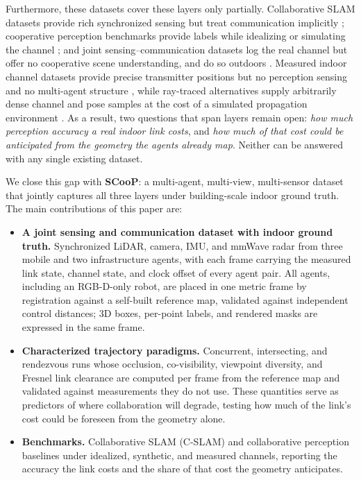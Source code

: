 \documentclass[conference]{IEEEtran}
\begin{document}
Furthermore, these datasets cover these layers only partially. Collaborative SLAM
datasets provide rich synchronized sensing but treat communication
implicitly \cite{s3e,kimeramulti,coped}; cooperative perception
benchmarks provide labels while idealizing or simulating the channel
\cite{opv2v,dairv2x,v2v4real}; and joint sensing--communication datasets
log the real channel but offer no cooperative scene understanding, and do
so outdoors \cite{deepsense6g}. Measured indoor channel datasets
provide precise transmitter positions but no perception sensing and no
multi-agent structure \cite{dichasus}, while ray-traced alternatives
supply arbitrarily dense channel and pose samples at the cost of a
simulated propagation environment \cite{deepmimo}. As a result, two questions that span layers remain open: \emph{how much
perception accuracy a real indoor link costs}, and \emph{how much of that
cost could be anticipated from the geometry the agents already map}.
Neither can be answered with any single existing dataset.

We close this gap with \textbf{SCooP}: a multi-agent, multi-view,
multi-sensor dataset that jointly captures all three layers under
building-scale indoor ground truth. The main contributions of this
paper are:
\begin{itemize}
    \item \textbf{A joint sensing and communication dataset with indoor ground truth.}
    Synchronized LiDAR, camera, IMU, and mmWave radar from three mobile and two
    infrastructure agents, with each frame carrying the measured link state,
    channel state, and clock offset of every agent pair. All agents, including an RGB-D-only robot, are placed in one metric
    frame by registration against a self-built reference map, validated
    against independent control distances; 3D boxes, per-point labels,
    and rendered masks are expressed in the same frame.
   \item \textbf{Characterized trajectory paradigms.}
    Concurrent, intersecting, and rendezvous runs whose occlusion, co-visibility, viewpoint diversity, and Fresnel link clearance are computed per frame from the reference map and validated against measurements they do not use. These quantities serve as predictors of where collaboration will degrade, testing how much of the link's cost could be foreseen from the geometry alone.
   \item \textbf{Benchmarks.} Collaborative SLAM (C-SLAM) and collaborative perception baselines under idealized, synthetic, and measured channels, reporting the accuracy the link costs and the share of that cost the geometry anticipates.
\end{itemize}
\end{document}
